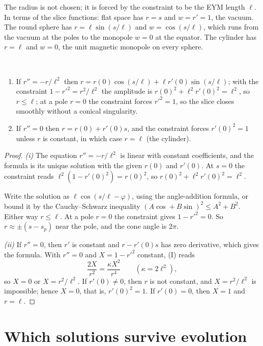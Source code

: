 The radius is not chosen; it is forced by the constraint to be the EYM length $\ell$. In terms of the slice functions: flat space has $r=s$ and $w=r'=1$, the vacuum. The round sphere has $r=\ell\sin(s/\ell)$ and $w=\cos(s/\ell)$, which runs from the vacuum at the poles to the monopole $w=0$ at the equator. The cylinder has $r=\ell$ and $w=0$, the unit magnetic monopole on every sphere.

\begin{proposition}\label{prop:globalform}\ver\
\begin{enumerate}[label=(\roman*)]
\item If $r''=-r/\ell^2$ then $r=r(0)\cos(s/\ell)+\ell r'(0)\sin(s/\ell)$; with the constraint $1-r'^2=r^2/\ell^2$ the amplitude is $r(0)^2+\ell^2r'(0)^2=\ell^2$, so $r\le\ell$; at a pole $r=0$ the constraint forces $r'^2=1$, so the slice closes smoothly without a conical singularity.
\item If $r''=0$ then $r=r(0)+r'(0)s$, and the constraint forces $r'(0)^2=1$ unless $r$ is constant, in which case $r=\ell$ (the cylinder).
\end{enumerate}
\end{proposition}
\begin{proof}
\emph{(i)} The equation $r''=-r/\ell^2$ is linear with constant coefficients, and the formula is its unique solution with the given $r(0)$ and $r'(0)$. At $s=0$ the constraint reads $\ell^2(1-r'(0)^2)=r(0)^2$, so $r(0)^2+\ell^2r'(0)^2=\ell^2$.

Write the solution as $\ell\cos(s/\ell-\varphi)$, using the angle-addition formula, or bound it by the Cauchy--Schwarz inequality $(A\cos+B\sin)^2\le A^2+B^2$. Either way $r\le\ell$. At a pole $r=0$ the constraint gives $1-r'^2=0$. So $r\approx\pm(s-s_p)$ near the pole, and the cone angle is $2\pi$.

\emph{(ii)} If $r''=0$, then $r'$ is constant and $r-r'(0)s$ has zero derivative, which gives the formula. With $r''=0$ and $X=1-r'^2$ constant, (I) reads
\[
\frac{2X}{r^2}=\frac{\kappa X^2}{r^4}\qquad(\kappa=2\ell^2),
\]
so $X=0$ or $X=r^2/\ell^2$. If $r'(0)\ne0$, then $r$ is not constant, and $X=r^2/\ell^2$ is impossible; hence $X=0$, that is, $r'(0)^2=1$. If $r'(0)=0$, then $X=1$ and $r=\ell$.
\end{proof}


\section{Which solutions survive evolution}

